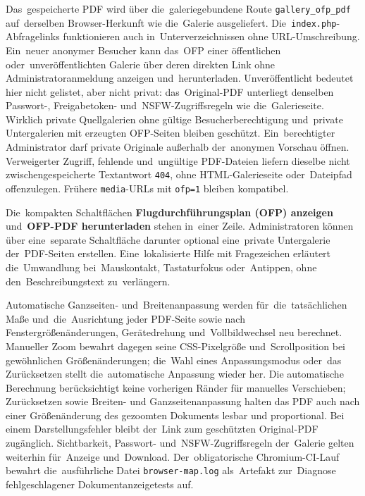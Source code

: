 \documentclass[11pt,a4paper]{article}
\newcommand{\ui}[1]{\textbf{#1}}
\newcommand{\codeword}[1]{\nolinkurl{#1}}
\begin{document}
Das~gespeicherte PDF wird über die~galeriegebundene Route
\codeword{gallery\_ofp\_pdf} auf~derselben Browser-Herkunft wie die~Galerie
ausgeliefert. Die~\codeword{index.php}-Abfragelinks funktionieren auch
in~Unterverzeichnissen ohne URL-Umschreibung. Ein~neuer anonymer Besucher kann
das~OFP einer öffentlichen oder~unveröffentlichten Galerie über deren direkten
Link ohne Administratoranmeldung anzeigen und~herunterladen. Unveröffentlicht
bedeutet hier nicht gelistet, aber nicht privat: das~Original-PDF unterliegt
denselben Passwort-, Freigabetoken- und~NSFW-Zugriffsregeln wie
die~Galerieseite. Wirklich private Quellgalerien ohne gültige
Besucherberechtigung und~private Untergalerien mit erzeugten OFP-Seiten bleiben
geschützt. Ein~berechtigter Administrator darf private Originale außerhalb
der~anonymen Vorschau öffnen. Verweigerter Zugriff, fehlende und~ungültige
PDF-Dateien liefern dieselbe nicht zwischengespeicherte Textantwort
\codeword{404}, ohne HTML-Galerieseite oder~Dateipfad offenzulegen. Frühere
\codeword{media}-URLs mit \codeword{ofp=1} bleiben kompatibel.

Die~kompakten Schaltflächen \ui{Flugdurchführungsplan (OFP) anzeigen}
und~\ui{OFP-PDF herunterladen} stehen in~einer Zeile. Administratoren können
über eine~separate Schaltfläche darunter optional eine~private Untergalerie
der~PDF-Seiten erstellen. Eine~lokalisierte Hilfe mit Fragezeichen erläutert
die~Umwandlung bei~Mauskontakt, Tastaturfokus oder~Antippen, ohne
den~Beschreibungstext zu~verlängern.

Automatische Ganzseiten- und~Breitenanpassung werden für~die~tatsächlichen Maße
und~die~Ausrichtung jeder PDF-Seite sowie nach Fenstergrößenänderungen,
Gerätedrehung und~Vollbildwechsel neu berechnet. Manueller Zoom bewahrt dagegen
seine CSS-Pixelgröße und~Scrollposition bei gewöhnlichen Größenänderungen;
die~Wahl eines Anpassungsmodus oder~das Zurücksetzen stellt die~automatische
Anpassung wieder her. Die automatische Berechnung berücksichtigt keine
vorherigen Ränder für manuelles Verschieben; Zurücksetzen sowie Breiten- und
Ganzseitenanpassung halten das PDF auch nach einer Größenänderung des gezoomten
Dokuments lesbar und proportional. Bei einem Darstellungsfehler bleibt der~Link
zum geschützten Original-PDF zugänglich. Sichtbarkeit, Passwort-
und~NSFW-Zugriffsregeln der~Galerie gelten weiterhin für~Anzeige und~Download.
Der~obligatorische Chromium-CI-Lauf bewahrt die~ausführliche Datei
\codeword{browser-map.log} als~Artefakt zur~Diagnose fehlgeschlagener
Dokumentanzeigetests auf.
\end{document}

